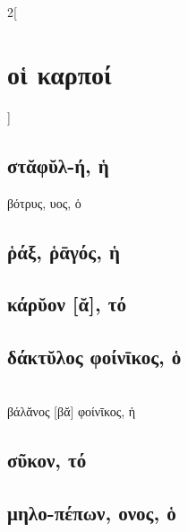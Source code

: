 \documentclass{book}
\begin{document}
\begin{multicols}{2}[\section{οἱ καρποί}]
\subsection{στᾰφῠλ-ή, ἡ}
βότρυς, υος, ὁ
\subsection{ῥάξ, ῥᾱγός, ἡ}
\subsection{κάρῠον [ᾰ], τό}
\subsection{δάκτῠλος φοίνῑκος, ὁ}
 ~\\
βάλᾰνος [βᾰ] φοίνῑκος, ἡ
\subsection{σῦκον, τό}
\subsection{μηλο-πέπων, ονος, ὁ}
~
\end{multicols}
\newpage  
\end{document}
